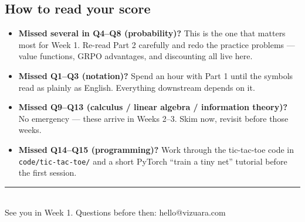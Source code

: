 \documentclass[11pt]{article}
\begin{document}
\subsection*{How to read your score}
\begin{itemize}
\item \textbf{Missed several in Q4–Q8 (probability)?} This is the one that matters most for Week 1. Re-read Part 2 carefully and redo the practice problems — value functions, GRPO advantages, and discounting all live here.
\item \textbf{Missed Q1–Q3 (notation)?} Spend an hour with Part 1 until the symbols read as plainly as English. Everything downstream depends on it.
\item \textbf{Missed Q9–Q13 (calculus / linear algebra / information theory)?} No emergency — these arrive in Weeks 2–3. Skim now, revisit before those weeks.
\item \textbf{Missed Q14–Q15 (programming)?} Work through the tic-tac-toe code in \texttt{code/tic-tac-toe/} and a short PyTorch ``train a tiny net'' tutorial before the first session.
\end{itemize}

\vspace{1.2em}
\begin{center}
\textcolor{rule}{\rule{4cm}{1pt}}\\[0.6em]
{\sffamily\footnotesize\color{ink3} See you in Week 1. Questions before then: hello@vizuara.com}
\end{center}
\end{document}

